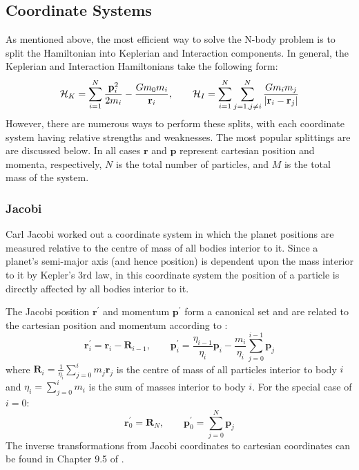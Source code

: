 \subsection{Coordinate Systems}
\label{sec:coords}
As mentioned above, the most efficient way to solve the N-body  problem is to split the Hamiltonian into Keplerian and Interaction components.
In general, the Keplerian and Interaction Hamiltonians take the following form:
\begin{equation}
\mathcal{H}_K = \sum_{i=1}^N \frac{\textbf{p}_i^2}{2m_i} - \frac{Gm_0m_i}{\textbf{r}_i}, \qquad
\mathcal{H}_I = \sum_{i=1}^{N}\sum_{j=1,j \ne i}^N \frac{Gm_im_j}{|\textbf{r}_i - \textbf{r}_j|}
\label{eq:Hgeneral}
\end{equation}
However, there are numerous ways to perform these splits, with each coordinate system having relative strengths and weaknesses. 
The most popular splittings are are discussed below. 
In all cases $\textbf{r}$ and $\textbf{p}$ represent cartesian position and momenta, respectively, $N$ is the total number of particles, and $M$ is the total mass of the system. 

\subsubsection{Jacobi}
\label{sec:Jacobi}
Carl Jacobi worked out a coordinate system in which the planet positions are measured relative to the centre of mass of all bodies interior to it. 
Since a planet's semi-major axis (and hence position) is dependent upon the mass interior to it by Kepler's 3rd law, in this coordinate system the position of a particle is directly affected by all bodies interior to it. 

The Jacobi position $\textbf{r}^{\prime}$ and momentum $\textbf{p}^{\prime}$ form a canonical set and are related to the cartesian position and momentum according to \citep{SSD1999}:
\begin{equation}
\textbf{r}^{\prime}_i = \textbf{r}_i - \textbf{R}_{i-1}, \qquad
\textbf{p}^{\prime}_i = \frac{\eta_{i-1}}{\eta_i}\textbf{p}_i - \frac{m_i}{\eta_i}\sum_{j=0}^{i-1} \textbf{p}_j
\end{equation}
where $\textbf{R}_i = \frac{1}{\eta_i} \sum_{j=0}^i m_j\textbf{r}_j$ is the centre of mass of all particles interior to body $i$ and $\eta_i = \sum_{j=0}^i m_i$ is the sum of masses interior to body $i$.
For the special case of $i=0$:
\begin{equation}
\textbf{r}^{\prime}_0 = \textbf{R}_{N}, \qquad
\textbf{p}^{\prime}_0 = \sum_{j=0}^{N} \textbf{p}_j
\end{equation}
The inverse transformations from Jacobi coordinates to cartesian coordinates can be found in Chapter 9.5 of \citet{SSD1999}.

